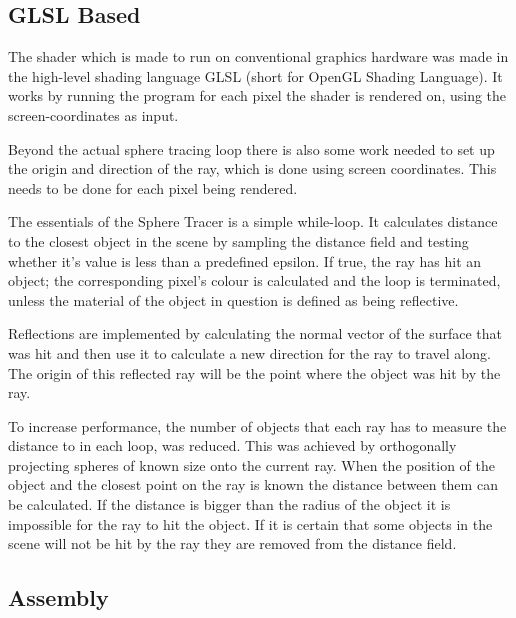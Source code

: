 		\subsection{GLSL Based}
			
			The shader which is made to run on conventional graphics hardware
			was made in the high-level shading language GLSL (short for 
			OpenGL Shading Language). It works by running the program for
			each pixel the shader is rendered on, using the screen-coordinates 
			as input.

			Beyond the actual sphere tracing loop there is also some work 
			needed to set up the origin and direction of the ray, which is done 
			using screen coordinates. This needs to be done for each pixel being 
			rendered.

			The essentials of the Sphere Tracer is a simple while-loop. It 
			calculates distance to the closest object in the scene by sampling 
			the distance field and testing whether it's value is less than a 
			predefined epsilon. If true, the ray has hit an object; the 
			corresponding pixel's colour is calculated and the loop is 
			terminated, unless the material of the object in question is defined
			as being reflective.

			Reflections are implemented by calculating the normal vector of the 
			surface that was hit and then use it to calculate a new direction 
			for the ray to travel along. The origin of this reflected ray will 
			be the point where the object was hit by the ray.

			To increase performance, the number of objects that each ray has to
			measure the distance to in each loop, was reduced. This was
			achieved by orthogonally projecting spheres of known size onto the
			current ray. When the position of the object and the closest point
			on the ray is known the distance between them can be calculated. If
			the distance is bigger than the radius of the object it is
			impossible for the ray to hit the object. If it is certain that
			some objects in the scene will not be hit by the ray they are
			removed from the distance field.

		\subsection{Assembly}
